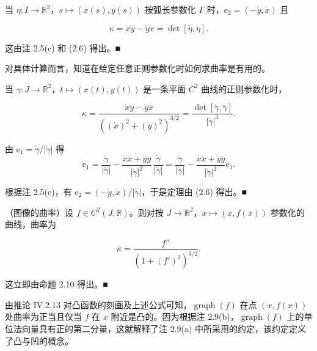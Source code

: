 \begin{remark}
\begin{items}
\item[（b）]

当 $ \eta : I \to \mathbb{R}^{2} $，$ s \mapsto (x(s), y(s)) $ 按弧长参数化 $ \Gamma $ 时，$ \mathrm{e}_{2} = (-\dot{y}, \dot{x}) $ 且

\[
\kappa = \dot{x}\ddot{y} - \dot{y}\ddot{x} = \det[\dot{\eta}, \ddot{\eta}] .
\]

\proofhead
这由注 2.5(c) 和 (2.6) 得出。\nobreak\hspace{0.35em}■
\end{items}

对具体计算而言，知道在给定任意正则参数化时如何求曲率是有用的。

\end{remark}

\begin{proposition}

当 $ \gamma : J \to \mathbb{R}^{2} $，$ t \mapsto (x(t), y(t)) $ 是一条平面 $ C^{2} $ 曲线的正则参数化时，

\[
\kappa = \frac{\dot{x}\ddot{y} - \dot{y}\ddot{x}}{\left((\dot{x})^{2} + (\dot{y})^{2}\right)^{3/2}} = \frac{\det[\dot{\gamma}, \ddot{\gamma}]}{|\dot{\gamma}|^{3}} .
\]

\proofhead
由 $ \mathrm{e}_{1} = \dot{\gamma}/|\dot{\gamma}| $ 得
\[
\dot{\mathrm{e}}_{1} = \frac{\ddot{\gamma}}{|\dot{\gamma}|} - \frac{\dot{x}\ddot{x} + \dot{y}\ddot{y}}{|\dot{\gamma}|^{2}}\,\frac{\dot{\gamma}}{|\dot{\gamma}|} = \frac{\ddot{\gamma}}{|\dot{\gamma}|} - \frac{\dot{x}\ddot{x} + \dot{y}\ddot{y}}{|\dot{\gamma}|^{2}}\mathrm{e}_{1} .
\]

根据注 2.5(c)，有 $ \mathrm{e}_{2} = (-\dot{y}, \dot{x})/|\dot{\gamma}| $，于是定理由 (2.6) 得出。\nobreak\hspace{0.35em}■

\end{proposition}

\begin{example}

（图像的曲率）设 $ f \in C^{2}(J, \mathbb{R}) $。则对按 $ J \to \mathbb{R}^{2} $，$ x \mapsto (x, f(x)) $ 参数化的曲线，曲率为

\[
\kappa = \frac{f''}{\left(1 + (f')^{2}\right)^{3/2}} .
\]

\proofhead
这立即由命题 2.10 得出。\nobreak\hspace{0.35em}■

由推论 IV.2.13 对凸函数的刻画及上述公式可知，$ \operatorname{graph}(f) $ 在点 $ (x, f(x)) $ 处曲率为正当且仅当 $ f $ 在 $ x $ 附近是凸的。因为根据注 2.9(b)，$ \operatorname{graph}(f) $ 上的单位法向量具有正的第二分量，这就解释了注 2.9(a) 中所采用的约定，该约定定义了凸与凹的概念。
\end{example}

